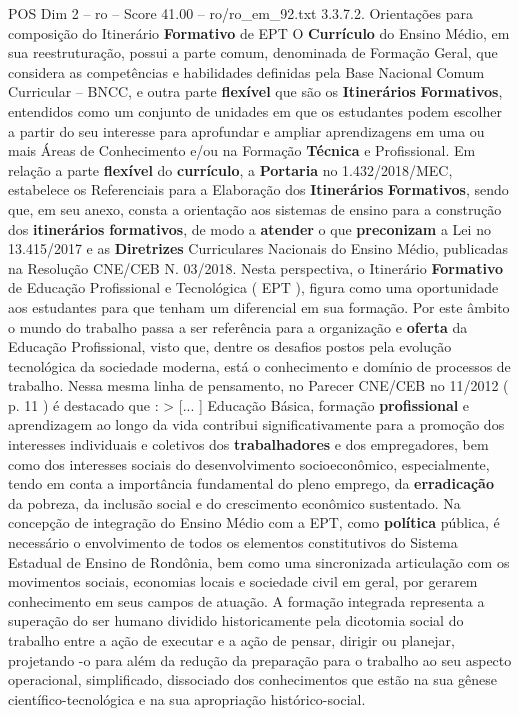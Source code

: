\begin{textsample}{POS Dim 2 – ro – Score 41.00 – ro/ro\_em\_92.txt}  \label{ex:f2_pos_181}
3.3.7.2.
Orientações para composição do Itinerário \textbf{Formativo} de EPT O \textbf{Currículo} do Ensino Médio, em sua reestruturação, possui a parte comum, denominada de Formação Geral, que considera as competências e habilidades definidas pela Base Nacional Comum Curricular – BNCC, e outra parte \textbf{flexível} que são os \textbf{Itinerários} \textbf{Formativos}, entendidos como um conjunto de unidades em que os estudantes podem escolher a partir do seu interesse para aprofundar e ampliar aprendizagens em uma ou mais Áreas de Conhecimento e/ou na Formação \textbf{Técnica} e Profissional.
Em relação a parte \textbf{flexível} do \textbf{currículo}, a \textbf{Portaria} no 1.432/2018/MEC, estabelece os Referenciais para a Elaboração dos \textbf{Itinerários} \textbf{Formativos}, sendo que, em seu anexo, consta a orientação aos sistemas de ensino para a construção dos \textbf{itinerários} \textbf{formativos}, de modo a \textbf{atender} o que \textbf{preconizam} a Lei no 13.415/2017 e as \textbf{Diretrizes} Curriculares Nacionais do Ensino Médio, publicadas na Resolução CNE/CEB N. 03/2018.
Nesta perspectiva, o Itinerário \textbf{Formativo} de Educação Profissional e Tecnológica ( EPT ), figura como uma oportunidade aos estudantes para que tenham um diferencial em sua formação.
Por este âmbito o mundo do trabalho passa a ser referência para a organização e \textbf{oferta} da Educação Profissional, visto que, dentre os desafios postos pela evolução tecnológica da sociedade moderna, está o conhecimento e domínio de processos de trabalho.
Nessa mesma linha de pensamento, no Parecer CNE/CEB no 11/2012 ( p. 11 ) é destacado que : > [... ] Educação Básica, formação \textbf{profissional} e aprendizagem ao longo da vida contribui significativamente para a promoção dos interesses individuais e coletivos dos \textbf{trabalhadores} e dos empregadores, bem como dos interesses sociais do desenvolvimento socioeconômico, especialmente, tendo em conta a importância fundamental do pleno emprego, da \textbf{erradicação} da pobreza, da inclusão social e do crescimento econômico sustentado.
Na concepção de integração do Ensino Médio com a EPT, como \textbf{política} pública, é necessário o envolvimento de todos os elementos constitutivos do Sistema Estadual de Ensino de Rondônia, bem como uma sincronizada articulação com os movimentos sociais, economias locais e sociedade civil em geral, por gerarem conhecimento em seus campos de atuação.
A formação integrada representa a superação do ser humano dividido historicamente pela dicotomia social do trabalho entre a ação de executar e a ação de pensar, dirigir ou planejar, projetando -o para além da redução da preparação para o trabalho ao seu aspecto operacional, simplificado, dissociado dos conhecimentos que estão na sua gênese científico-tecnológica e na sua apropriação histórico-social.

\end{textsample}
